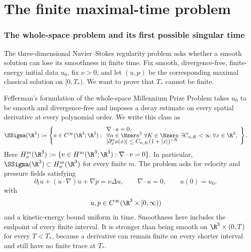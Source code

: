 \part{The finite maximal-time problem}

\section{The whole-space problem and its first possible singular time}
\label{sec:whole-space-problem}

The three-dimensional Navier--Stokes regularity problem asks whether a smooth
solution can lose its smoothness in finite time.  Fix smooth,
divergence-free, finite-energy initial data \(u_0\), fix \(\nu>0\), and let
\((u,p)\) be the corresponding maximal classical solution on \([0,T_*)\).
We want to prove that \(T_*\) cannot be finite.

Fefferman's formulation of the whole-space Millennium Prize Problem takes
\(u_0\) to be smooth and divergence-free and imposes a decay estimate on every
spatial derivative at every polynomial order.  We write this class as
\begin{equation*}
 \SSigma(\R^3)
 :=\left\{a\in C^\infty(\R^3;\R^3):
 \begin{array}{l}
 \nabla\cdot a=0,\\[-2pt]
 \forall\alpha\in\Nzero^3\ \forall K\in\Nzero\
 \exists C_{\alpha,K}<\infty\ \forall x\in\R^3,\\[-2pt]
 |\partial_x^\alpha a(x)|
 \le C_{\alpha,K}(1+|x|)^{-K}
 \end{array}\right\}.
\end{equation*}
Here \(H^m_\sigma(\R^3):=\{v\in H^m(\R^3;\R^3):\nabla\cdot v=0\}\).  In
particular, \(\SSigma(\R^3)\subset H^m_\sigma(\R^3)\) for every finite \(m\).
The problem asks for velocity and pressure fields satisfying
\begin{equation}
 \partial_tu+(u\cdot\nabla)u+\nabla p=\nu\Delta u,
 \qquad
 \nabla\cdot u=0,
 \qquad
 u(0)=u_0,
 \label{eq:NS}
\end{equation}
with
\[
 u,p\in C^\infty(\R^3\times[0,\infty))
\]
and a kinetic-energy bound uniform in time.  Smoothness here
includes the endpoint of every finite interval.  It is stronger than being
smooth on \(\R^3\times(0,T)\) for every \(T<T_*\), because a derivative can
remain finite on every shorter interval and still have no finite trace at
\(T_*\).

